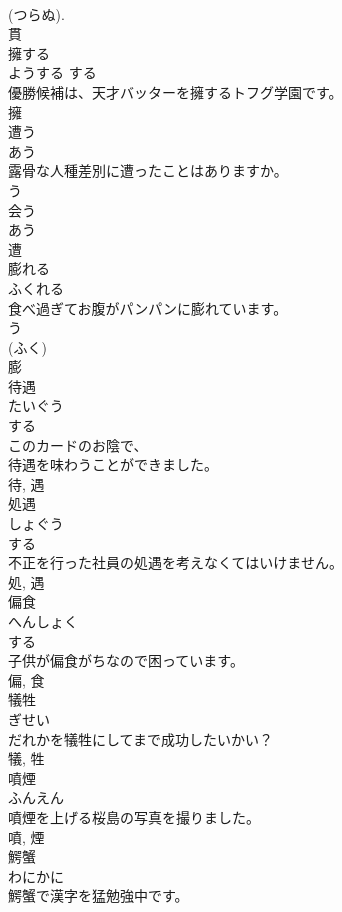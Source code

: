 \documentclass[8pt]{extreport}
\begin{document}
\begin{CJK}{UTF8}{min}
\\	(つらぬ). 
\\	貫	
\\	擁する	
\\	ようする	する 
\\	優勝候補は、天才バッターを擁するトフグ学園です。	
\\	擁	
\\	遭う	
\\	あう	
\\	露骨な人種差別に遭ったことはありますか。	
\\	う 
\\	会う 
\\	あう 
\\	遭	
\\	膨れる	
\\	ふくれる	
\\	食べ過ぎてお腹がパンパンに膨れています。	
\\	う 
\\	(ふく) 
\\	膨	
\\	待遇	
\\	たいぐう	
\\	する 
\\	このカードのお陰で、
\\	待遇を味わうことができました。	
\\	待, 遇	
\\	処遇	
\\	しょぐう	
\\	する 
\\	不正を行った社員の処遇を考えなくてはいけません。	
\\	処, 遇	
\\	偏食	
\\	へんしょく	
\\	する 
\\	子供が偏食がちなので困っています。	
\\	偏, 食	
\\	犠牲	
\\	ぎせい	
\\	だれかを犠牲にしてまで成功したいかい？	
\\	犠, 牲	
\\	噴煙	
\\	ふんえん	
\\	噴煙を上げる桜島の写真を撮りました。	
\\	噴, 煙	
\\	鰐蟹	
\\	わにかに	
\\	鰐蟹で漢字を猛勉強中です。	

\end{CJK}
\end{document}
